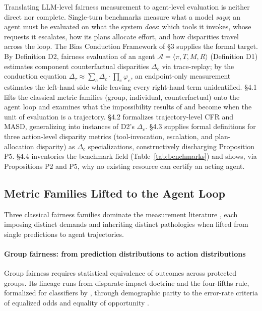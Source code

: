 \documentclass[acmsmall,nonacm]{acmart}
\begin{document}
Translating LLM-level fairness measurement to agent-level evaluation is neither direct nor complete. Single-turn benchmarks measure what a model \emph{says}; an agent must be evaluated on what the system \emph{does}: which tools it invokes, whose requests it escalates, how its plans allocate effort, and how disparities travel across the loop. The Bias Conduction Framework of \S{}3 supplies the formal target. By Definition D2, fairness evaluation of an agent $\mathcal{A} = \langle \pi, T, M, R \rangle$ (Definition D1) estimates component counterfactual disparities $\Delta_c$ via trace-replay; by the conduction equation $\Delta_\tau \approx \sum_c \Delta_c \cdot \prod_{e} \varphi_e$, an endpoint-only measurement estimates the left-hand side while leaving every right-hand term unidentified. \S{}4.1 lifts the classical metric families (group, individual, counterfactual) onto the agent loop and examines what the impossibility results of \cite{kleinberg2017inherent} and \cite{chouldechova2017fair} become when the unit of evaluation is a trajectory. \S{}4.2 formalizes trajectory-level CFR and MASD, generalizing \cite{mayilvaghanan2026counterfactual} into instances of D2's $\Delta_c$. \S{}4.3 supplies formal definitions for three action-level disparity metrics (tool-invocation, escalation, and plan-allocation disparity) as $\Delta_c$ specializations, constructively discharging Proposition P5. \S{}4.4 inventories the benchmark field (Table~\ref{tab:benchmarks}) and shows, via Propositions P2 and P5, why no existing resource can certify an acting agent.

\subsection{Metric Families Lifted to the Agent Loop}

Three classical fairness families dominate the measurement literature \cite{mehrabi2021survey,caton2024fairness,pessach2022review,barocas2023fairness}, each imposing distinct demands and inheriting distinct pathologies when lifted from single predictions to agent trajectories.

\paragraph{Group fairness: from prediction distributions to action distributions}

Group fairness requires statistical equivalence of outcomes across protected groups. Its lineage runs from disparate-impact doctrine and the four-fifths rule, formalized for classifiers by \cite{feldman2015certifying}, through demographic parity to the error-rate criteria of equalized odds and equality of opportunity \cite{hardt2016equality}.
\end{document}
